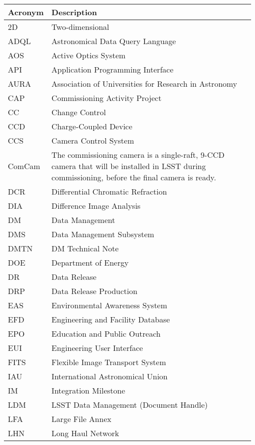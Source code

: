 \addtocounter{table}{-1}
\begin{longtable}{p{}p{}}\hline
\textbf{Acronym} & \textbf{Description}  \\\hline

2D & Two-dimensional \\\hline
ADQL & Astronomical Data Query Language \\\hline
AOS & Active Optics System \\\hline
API & Application Programming Interface \\\hline
AURA & Association of Universities for Research in Astronomy \\\hline
CAP & Commissioning Activity Project \\\hline
CC & Change Control \\\hline
CCD & Charge-Coupled Device \\\hline
CCS & Camera Control System \\\hline
ComCam & The commissioning camera is a single-raft, 9-CCD camera that will be installed in LSST during commissioning, before the final camera is ready. \\\hline
DCR & Differential Chromatic Refraction \\\hline
DIA & Difference Image Analysis \\\hline
DM & Data Management \\\hline
DMS & Data Management Subsystem \\\hline
DMTN & DM Technical Note \\\hline
DOE & Department of Energy \\\hline
DR & Data Release \\\hline
DRP & Data Release Production \\\hline
EAS & Environmental Awareness System \\\hline
EFD & Engineering and Facility Database \\\hline
EPO & Education and Public Outreach \\\hline
EUI & Engineering User Interface \\\hline
FITS & Flexible Image Transport System \\\hline
IAU & International Astronomical Union \\\hline
IM & Integration Milestone \\\hline
LDM & LSST Data Management (Document Handle) \\\hline
LFA & Large File Annex \\\hline
LHN & Long Haul Network \\\hline

\end{longtable}
